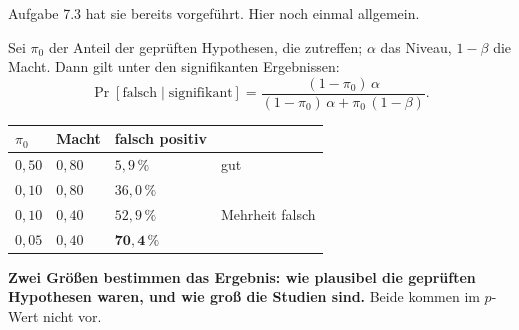 \begin{merksatz}
Aufgabe 7.3 hat sie bereits vorgeführt. Hier noch einmal allgemein.

Sei $\pi_0$ der Anteil der geprüften Hypothesen, die zutreffen; $\alpha$ das Niveau, $1-\beta$ die Macht. Dann gilt unter den signifikanten Ergebnissen:
\[ \Pr[\text{falsch} \mid \text{signifikant}] = \frac{(1-\pi_0)\,\alpha}{(1-\pi_0)\,\alpha + \pi_0\,(1-\beta)} . \]

\begin{center}
{\small
\renewcommand{\arraystretch}{1.48}
\begin{tabular}{@{}P{1.8cm}P{1.8cm}P{2.4cm}P{2.0cm}@{}}
\toprule
$\pi_0$ & \textbf{Macht} & \textbf{falsch positiv} & \\
\midrule
$0{,}50$ & $0{,}80$ & $5{,}9\,\%$ & \textcolor{gruen}{gut}\\
$0{,}10$ & $0{,}80$ & $36{,}0\,\%$ & \\
$0{,}10$ & $0{,}40$ & $52{,}9\,\%$ & \textcolor{akzent}{Mehrheit falsch}\\
$0{,}05$ & $0{,}40$ & \textcolor{akzent}{$\mathbf{70{,}4\,\%}$} & \\
\bottomrule
\end{tabular}}
\end{center}

\begin{center}
\begin{minipage}{0.9\textwidth}
\textbf{Zwei Größen bestimmen das Ergebnis: wie plausibel die geprüften Hypothesen waren, und wie groß die Studien sind.} Beide kommen im $p$-Wert nicht vor.
\end{minipage}
\end{center}

\begin{center}
\begin{minipage}{0.88\textwidth}
\end{minipage}
\end{center}
\end{merksatz}


